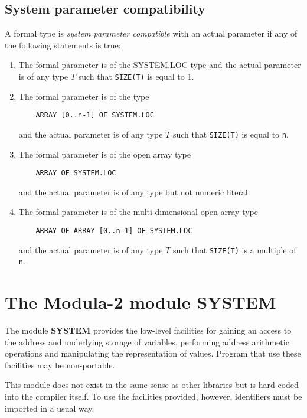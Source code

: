 \subsection{System parameter compatibility}\label{m2:ISO:comp:system}

A formal type is {\em system parameter compatible} with an actual
parameter if any of the following statements is true:
\renewcommand{\theenumi}{\alph{enumi}}
\begin{enumerate}
\item   The formal parameter is of the SYSTEM.LOC type
        and the actual
        parameter is of any type $T$ such that {\tt SIZE(T)} is equal to 1.

\item   The formal parameter is of the type

\verb'    ARRAY [0..n-1] OF SYSTEM.LOC'

        and the actual parameter is of any type $T$ such
        that {\tt SIZE(T)} is equal to {\tt n}.

\item   The formal parameter is of the open array type

\verb'    ARRAY OF SYSTEM.LOC'

        and the actual parameter is of any type but not numeric literal.

\item   The formal parameter is of the multi-dimensional open array type

\verb'    ARRAY OF ARRAY [0..n-1] OF SYSTEM.LOC'

        and the actual parameter is of any type $T$ such
        that {\tt SIZE(T)} is a multiple of {\tt n}.

\end{enumerate}
\renewcommand{\theenumi}{\arabic{enumi}}

\section{The Modula-2 module SYSTEM}
\label{m2:ISO:system}

The module {\bf SYSTEM} provides the low-level facilities for
gaining an access to the address and underlying storage of
variables, performing address arithmetic operations and
manipulating the representation of values. Program that use
these facilities may be non-portable.

This module does not exist in the same sense as other libraries
but is hard-coded into the compiler itself. To use the facilities
provided, however, identifiers must be imported in a usual way.

